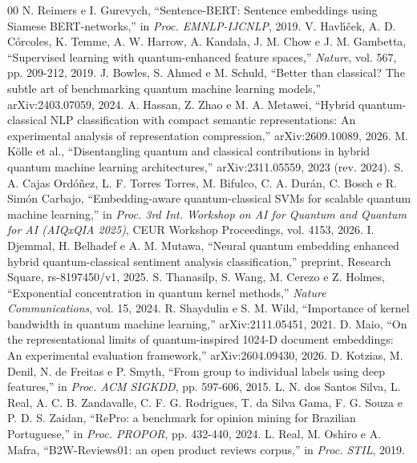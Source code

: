 \documentclass[conference]{IEEEtran}
\begin{document}
\begin{thebibliography}{00}
 N. Reimers e I. Gurevych, ``Sentence-BERT: Sentence embeddings using Siamese BERT-networks,'' in \textit{Proc. EMNLP-IJCNLP}, 2019.
 V. Havl\'{\i}\v{c}ek, A. D. C\'{o}rcoles, K. Temme, A. W. Harrow, A. Kandala, J. M. Chow e J. M. Gambetta, ``Supervised learning with quantum-enhanced feature spaces,'' \textit{Nature}, vol. 567, pp. 209-212, 2019.
 J. Bowles, S. Ahmed e M. Schuld, ``Better than classical? The subtle art of benchmarking quantum machine learning models,'' arXiv:2403.07059, 2024.
 A. Hassan, Z. Zhao e M. A. Metawei, ``Hybrid quantum-classical NLP classification with compact semantic representations: An experimental analysis of representation compression,'' arXiv:2609.10089, 2026.
 M. Kölle et al., ``Disentangling quantum and classical contributions in hybrid quantum machine learning architectures,'' arXiv:2311.05559, 2023 (rev. 2024).
 S. A. Cajas Ord\'{o}\~{n}ez, L. F. Torres Torres, M. Bifulco, C. A. Dur\'{a}n, C. Bosch e R. Sim\'{o}n Carbajo, ``Embedding-aware quantum-classical SVMs for scalable quantum machine learning,'' in \textit{Proc. 3rd Int. Workshop on AI for Quantum and Quantum for AI (AIQxQIA 2025)}, CEUR Workshop Proceedings, vol. 4153, 2026.
 I. Djemmal, H. Belhadef e A. M. Mutawa, ``Neural quantum embedding enhanced hybrid quantum-classical sentiment analysis classification,'' preprint, Research Square, rs-8197450/v1, 2025.
 S. Thanasilp, S. Wang, M. Cerezo e Z. Holmes, ``Exponential concentration in quantum kernel methods,'' \textit{Nature Communications}, vol. 15, 2024.
 R. Shaydulin e S. M. Wild, ``Importance of kernel bandwidth in quantum machine learning,'' arXiv:2111.05451, 2021.
 D. Maio, ``On the representational limits of quantum-inspired 1024-D document embeddings: An experimental evaluation framework,'' arXiv:2604.09430, 2026.
 D. Kotzias, M. Denil, N. de Freitas e P. Smyth, ``From group to individual labels using deep features,'' in \textit{Proc. ACM SIGKDD}, pp. 597-606, 2015.
 L. N. dos Santos Silva, L. Real, A. C. B. Zandavalle, C. F. G. Rodrigues, T. da Silva Gama, F. G. Souza e P. D. S. Zaidan, ``RePro: a benchmark for opinion mining for Brazilian Portuguese,'' in \textit{Proc. PROPOR}, pp. 432-440, 2024.
 L. Real, M. Oshiro e A. Mafra, ``B2W-Reviews01: an open product reviews corpus,'' in \textit{Proc. STIL}, 2019.

\end{thebibliography}
\end{document}
